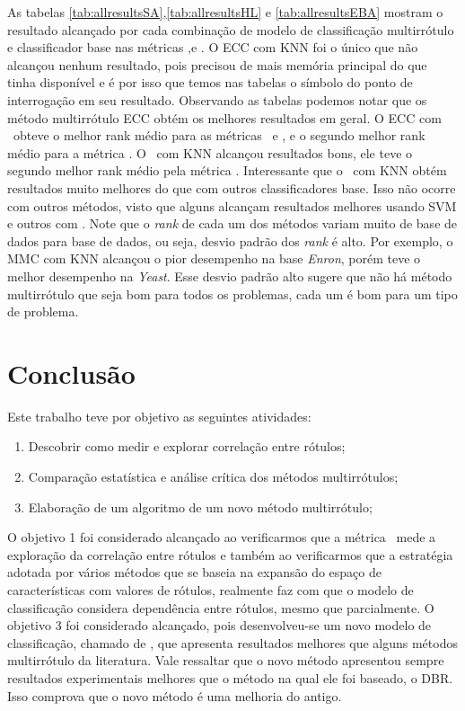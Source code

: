 As tabelas \ref{tab:allresultsSA},\ref{tab:allresultsHL} e \ref{tab:allresultsEBA} mostram o  resultado alcançado
por cada combinação de modelo de classificação multirrótulo e classificador base nas métricas \SA,\HL e \EBA.
O ECC com KNN foi o único que não alcançou nenhum resultado, pois precisou de mais memória principal do que
tinha disponível e é por isso que temos nas tabelas o símbolo do ponto de interrogação em seu resultado.
Observando as tabelas podemos notar
que os método multirrótulo ECC obtém os melhores resultados em geral. O ECC com \jqo~obteve o 
melhor rank médio para as métricas \SA~e \HL, e o segundo melhor rank médio para a métrica \EBA.
O \MRLMa~com KNN alcançou resultados bons, ele teve o segundo melhor rank médio pela métrica \SA.
Interessante que o \MRLMa~com KNN obtém resultados muito melhores do que com outros classificadores base.
Isso não ocorre com outros métodos, visto que alguns alcançam resultados melhores usando SVM e outros com \jqo.
Note que o \textit{rank} de cada um dos métodos variam muito de base de dados para base de dados, ou seja, desvio padrão
dos \textit{rank} é alto. Por exemplo, o MMC com KNN alcançou o pior desempenho na base \textit{Enron}, porém 
teve o melhor desempenho na \textit{Yeast}. Esse desvio padrão alto sugere que não há método multirrótulo que
seja bom para todos os problemas, cada um é bom para um tipo de problema.



\chapter{Conclusão}
Este trabalho teve por objetivo as seguintes atividades:
\begin{enumerate}
 \item Descobrir como medir e explorar correlação entre rótulos;
 \item Comparação estatística e análise crítica dos métodos multirrótulos;
 \item Elaboração de um algoritmo de um novo método multirrótulo;
\end{enumerate}
O objetivo 1 foi considerado alcançado ao verificarmos que a métrica \SA~mede a 
exploração da correlação entre rótulos e também ao verificarmos que a estratégia adotada por vários 
métodos que se baseia na expansão do espaço de características com valores de rótulos, realmente
faz com que o modelo de classificação considera dependência entre rótulos, mesmo que parcialmente.
O objetivo 3 foi considerado alcançado, pois desenvolveu-se um novo modelo de classificação,
chamado de \MRLM, que apresenta resultados melhores que alguns métodos multirrótulo da literatura.
Vale ressaltar que o novo método apresentou sempre resultados experimentais melhores que o método na qual
ele foi baseado, o DBR. Isso comprova que o novo método é uma melhoria do antigo.

